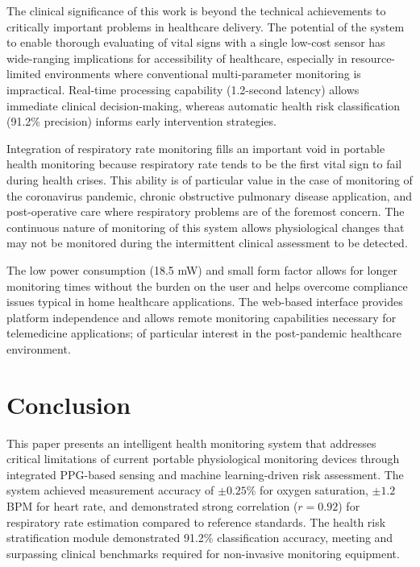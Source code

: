 \documentclass{ieeeaccess}
\begin{document}
The clinical significance of this work is beyond the technical achievements to critically important problems in healthcare delivery. The potential of the system to enable thorough evaluating of vital signs with a single low-cost sensor has wide-ranging implications for accessibility of healthcare, especially in resource-limited environments where conventional multi-parameter monitoring is impractical. Real-time processing capability (1.2-second latency) allows immediate clinical decision-making, whereas automatic health risk classification (91.2\% precision) informs early intervention strategies.

Integration of respiratory rate monitoring fills an important void in portable health monitoring because respiratory rate tends to be the first vital sign to fail during health crises. This ability is of particular value in the case of monitoring of the coronavirus pandemic, chronic obstructive pulmonary disease application, and post-operative care where respiratory problems are of the foremost concern. The continuous nature of monitoring of this system allows physiological changes that may not be monitored during the intermittent clinical assessment to be detected.

The low power consumption (18.5 mW) and small form factor allows for longer monitoring times without the burden on the user and helps overcome compliance issues typical in home healthcare applications. The web-based interface provides platform independence and allows remote monitoring capabilities necessary for telemedicine applications; of particular interest in the post-pandemic healthcare environment.



\section{Conclusion}
\label{sec:conclusion}
This paper presents an intelligent health monitoring system that addresses critical limitations of current portable physiological monitoring devices through integrated PPG-based sensing and machine learning-driven risk assessment. The system achieved measurement accuracy of $\pm 0.25\%$ for oxygen saturation, $\pm 1.2$ BPM for heart rate, and demonstrated strong correlation ($r = 0.92$) for respiratory rate estimation compared to reference standards. The health risk stratification module demonstrated 91.2\% classification accuracy, meeting and surpassing clinical benchmarks required for non-invasive monitoring equipment.
\end{document}
